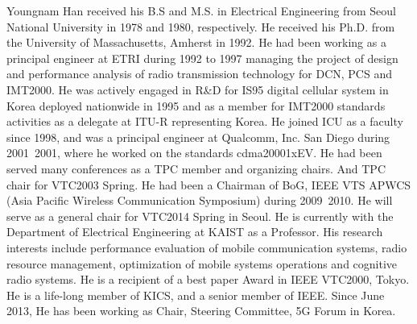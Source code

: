 \documentclass[journal,twoside]{IEEEtranTCOM}
\begin{document}
\begin{biography}{Youngnam Han}
received his B.S and M.S. in Electrical Engineering from Seoul National University in 1978 and 1980, respectively. He received his Ph.D. from the University of Massachusetts, Amherst in 1992. He had been working as a principal engineer at ETRI during 1992 to 1997 managing the project of design and performance analysis of radio transmission technology for DCN, PCS and IMT2000. He was actively engaged in R\&D for IS95 digital cellular system in Korea deployed nationwide in 1995 and as a member for IMT2000 standards activities as a delegate at ITU-R representing Korea. He joined ICU as a faculty since 1998, and was a principal engineer at Qualcomm, Inc. San Diego during 2001~2001, where he worked on the standards cdma20001xEV. He had been served many conferences as a TPC member and organizing chairs. And TPC chair for VTC2003 Spring. He had been a Chairman of BoG, IEEE VTS APWCS (Asia Pacific Wireless Communication Symposium) during 2009~2010. He will serve as a general chair for VTC2014 Spring in Seoul. He is currently with the Department of Electrical Engineering at KAIST as a Professor. His research interests include performance evaluation of mobile communication systems, radio resource management, optimization of mobile systems operations and cognitive radio systems. He is a recipient of a best paper Award in IEEE VTC2000, Tokyo. He is a life-long member of KICS, and a senior member of IEEE. Since June 2013, He has been working as Chair, Steering Committee, 5G Forum in Korea.
\end{biography}
\end{document}
